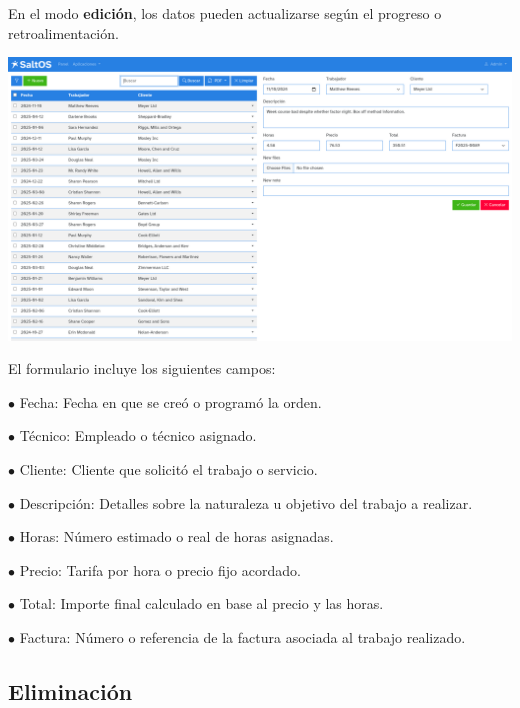 \documentclass[a4paper]{article}
\begin{document}
En el modo \textbf{edición}, los datos pueden actualizarse según el progreso o retroalimentación.

\begin{center}\includegraphics[width=1\textwidth]{../ujest/snaps/test-screenshots-js-screenshots-sales-workorders-edit-100-es-es-1-snap.png}\end{center}

El formulario incluye los siguientes campos:

\begin{compactitem}
\item[\color{myblue}$\bullet$] Fecha: Fecha en que se creó o programó la orden.
\item[\color{myblue}$\bullet$] Técnico: Empleado o técnico asignado.
\item[\color{myblue}$\bullet$] Cliente: Cliente que solicitó el trabajo o servicio.
\item[\color{myblue}$\bullet$] Descripción: Detalles sobre la naturaleza u objetivo del trabajo a realizar.
\item[\color{myblue}$\bullet$] Horas: Número estimado o real de horas asignadas.
\item[\color{myblue}$\bullet$] Precio: Tarifa por hora o precio fijo acordado.
\item[\color{myblue}$\bullet$] Total: Importe final calculado en base al precio y las horas.
\item[\color{myblue}$\bullet$] Factura: Número o referencia de la factura asociada al trabajo realizado.
\end{compactitem}

\hypertarget{toc175}{}
\subsection{Eliminación}
\end{document}
